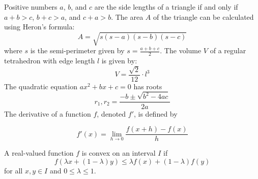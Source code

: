 \documentclass{article}
\begin{document}
Positive numbers $a$, $b$, and $c$ are the side lengths of a triangle if and only if $a + b > c$, $b + c > a$, and $c + a > b$.
The area \(A\) of the triangle can be calculated using Heron's formula:
\[
A = \sqrt{s(s-a)(s-b)(s-c)}
\]
where \(s\) is the semi-perimeter given by \(s = \frac{{a+b+c}}{2}\).
The volume \(V\) of a regular tetrahedron with edge length \(l\) is given by:
\[
V = \frac{{\sqrt{2}}}{12} \cdot l^3
\]
The quadratic equation $ax^2 + bx + c = 0$ has roots 
\[
r_{1},r_{2} = \frac{{-b \pm \sqrt{b^2 - 4ac}}}{{2a}}
\]
The derivative of a function \(f\), denoted \(f'\), is defined by 
\begin{center}
\[
f'(x) = \lim_{{h \to 0}} \frac{{f(x+h)-f(x)}}{h}
\]
\end{center}
A real-valued function \(f\) is convex on an interval \(I\) if  
\[
f(\lambda x + (1-\lambda)y) \leq \lambda f(x) + (1-\lambda) f(y)
\]
for all \(x, y \in I\) and \(0 \leq \lambda \leq 1\).
\end{document}
